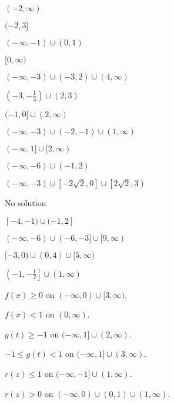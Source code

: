 \begin{shortexenum}[MMMMMMMMMMMMMMMM]
\item $(-2, \infty)$
\item $(-2, 3]$
\item $(-\infty, -1) \cup (0, 1)$
\item $[0, \infty)$
\item $(-\infty, -3) \cup (-3,2) \cup (4, \infty)$
\item $\left(-3, -\frac{1}{3} \right) \cup (2,3)$
\item $(-1,0] \cup (2, \infty)$
\item $(-\infty, -3) \cup (-2, -1) \cup (1, \infty)$
\item $(-\infty, 1] \cup [2, \infty)$
\item $(-\infty, -6) \cup (-1, 2)$
\item $(-\infty, -3) \cup \left[-2\sqrt{2}, 0\right] \cup \left[2\sqrt{2}, 3\right)$
\item No solution
\item  $[-4, -1) \cup (-1,2]$
\item   $(-\infty, -6) \cup (-6, -3] \cup [9, \infty)$
\item $[-3,0) \cup (0,4) \cup [5, \infty)$
\item  $\left(-1,-\frac{1}{2}\right] \cup (1, \infty)$
\item $f(x) \geq 0$ on $(-\infty, 0) \cup [3, \infty)$.
\item $f(x) < 1$ on $(0, \infty)$.
\item  $g(t) \geq -1$ on $(-\infty, 1] \cup (2, \infty)$.
\item  $-1 \leq g(t) < 1$ on $(-\infty, 1] \cup (3, \infty)$.
\item  $r(z) \leq 1$ on $(-\infty, -1] \cup (1, \infty)$.
\item  $r(z) > 0$ on $(-\infty, 0) \cup (0,1) \cup (1, \infty)$.
\end{shortexenum}

